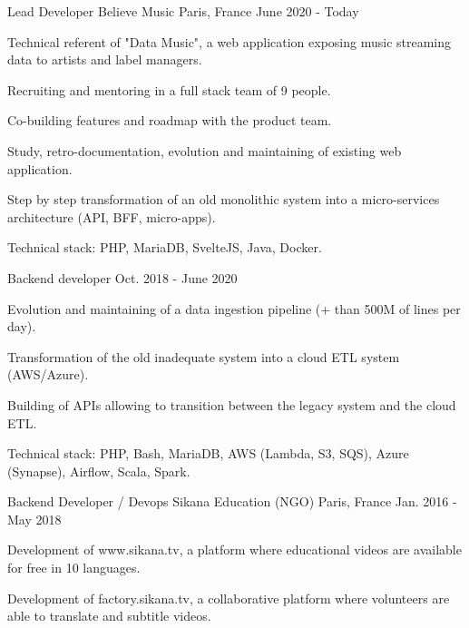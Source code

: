 \begin{cventries}
  \cventry
    {Lead Developer}
    {Believe Music}
    {Paris, France}
    {June 2020 - Today}
    {
      \begin{cvitems}
        \item {Technical referent of "Data Music", a web application exposing music streaming data to artists and label managers.}
        \item {Recruiting and mentoring in a full stack team of 9 people.}
        \item {Co-building features and roadmap with the product team.}
        \item {Study, retro-documentation, evolution and maintaining of existing web application.}
        \item {Step by step transformation of an old monolithic system into a micro-services architecture (API, BFF, micro-apps).}
        \item {Technical stack: PHP, MariaDB, SvelteJS, Java, Docker.}
      \end{cvitems}
      \vspace{-2.0mm}
    }
  \cventry
    {Backend developer}
    {}
    {}
    {Oct. 2018 - June 2020}
    {
      \begin{cvitems}
        \item {Evolution and maintaining of a data ingestion pipeline (+ than 500M of lines per day).}
        \item {Transformation of the old inadequate system into a cloud ETL system (AWS/Azure).}
        \item {Building of APIs allowing to transition between the legacy system and the cloud ETL.}
        \item {Technical stack: PHP, Bash, MariaDB, AWS (Lambda, S3, SQS), Azure (Synapse), Airflow, Scala, Spark.}
      \end{cvitems}
    }
  \cventry
    {Backend Developer / Devops}
    {Sikana Education (NGO)}
    {Paris, France}
    {Jan. 2016 - May 2018}
    {
      \begin{cvitems}
        \item {Development of www.sikana.tv, a platform where educational videos are available for free in 10 languages.}
        \item {Development of factory.sikana.tv, a collaborative platform where volunteers are able to translate and subtitle videos.}

\end{cvitems}}
\end{cventries}
